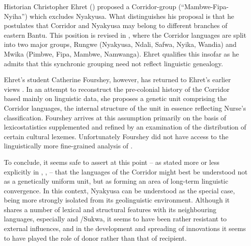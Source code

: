 Historian Christopher Ehret (\citeyear{EhretC1973}) proposed a Corridor-group (``Mambwe-Fi\-pa-Nyiha'') which excludes Nyakyusa. What distinguishes his proposal is that he postulates that Corridor and Nyakyusa may belong to different branches of eastern Bantu. This position is revised in \citet[36f, 55]{EhretC2001}, where the Corridor languages are split into two major groups, Rungwe (Nyakyusa, Ndali, Safwa, Nyika, Wandia) and Mwika (Pimbwe, Fipa, Mambwe, Namwanga). Ehret qualifies this insofar as he admits that this synchronic grouping need not reflect linguistic genealogy.

Ehret's student Catherine Fourshey, however, has returned to Ehret's earlier views \citep{FoursheyC2002}. In an attempt to reconstruct the pre-colonial history of the Corridor based mainly on linguistic data, she proposes a genetic unit comprising the Corridor languages, the internal structure of the unit in essence reflecting Nurse's classification. Fourshey arrives at this assumption primarily on the basis of lexicostatistics supplemented and refined by an examination of the distribution of certain cultural lexemes. Unfortunately Fourshey did not have access to the linguistically more fine-grained analysis of \citet{LabroussiC1998}.

To conclude, it seems safe to assert at this point -- as stated more or less explicitly in \citet{NurseD1988}, \citet{LabroussiC1998}, \citet{NurseDPhillipsonG2003b} -- that the languages of the Corridor might best be understood not as a genetically uniform unit, but as forming an area of long-term linguistic convergence. In this context, Nyakyusa can be understood as the special case, being more strongly isolated from its geolinguistic environment. Although it shares a number of lexical and structural features with its neighbouring languages, especially  and /Sukwa, it seems to have been rather resistant to external influences, and in the development and spreading of innovations it seems to have played the role of donor rather than that of recipient.

\largerpage[-2]
